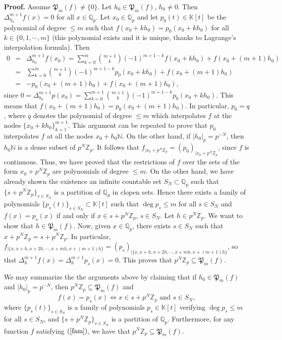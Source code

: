 \documentclass[12pt,a4paper]{amsart}
\theoremstyle{definition}
\begin{document}
\noindent \textbf{Proof. }  Assume  $\mathfrak{P}_m(f) \neq \{0\}$. Let  $h_0\in \mathfrak{P}_m(f)$, $h_0\neq 0$. Then
$\Delta_{h_0}^{m+1}f(x)=0$ for all $x\in\mathbb{Q}_p$. Let $x_0\in\mathbb{Q}_p$ and let $p_0(t)\in\mathbb{K}[t]$ be the polynomial of degree $\leq m$ such that $f(x_0+kh_0)=p_0(x_0+kh_0)$ for all $k\in\{0,1,\cdots,m\}$ (this polynomial exists and it is unique, thanks to Lagrange's interpolation formula). Then
\begin{eqnarray*}
0 &=&
\Delta_{h_0}^{m+1}f(x_0)=\sum_{k=0}^m\binom{m+1}{k}(-1)^{m+1-k}f(x_0+kh_0)+f(x_0+(m+1)h_0)\\
&=& \sum_{k=0}^m\binom{m+1}{k}(-1)^{m+1-k}p_0(x_0+kh_0)+f(x_0+(m+1)h_0)\\
&=& -p_0(x_0+(m+1)h_0)+f(x_0+(m+1)h_0),
\end{eqnarray*}
since  $0=\Delta_{h_0}^{m+1}p(x_0)=\sum_{k=0}^{m+1}\binom{m+1}{k}(-1)^{m+1-k}p_0(x_0+kh_0)$. This means that $f(x_0+(m+1)h_0)=p_0(x_0+(m+1)h_0)$. In particular, $p_0=q$, where $q$ denotes the polynomial of degree $\leq m$ which interpolates $f$ at the nodes $\{x_0+kh_0\}_{k=1}^{m+1}$. This argument can be repeated to prove that $p_0$ interpolates $f$ at all the nodes $x_0+h_0\mathbb{N}$. On the other hand, if $|h_0|_p=p^{-N}$, then $h_0\mathbb{N}$ is a dense subset of $p^N\mathbb{Z}_p$. It follows that $f_{|x_0+p^N\mathbb{Z}_p}=(p_0)_{|x_0+p^N\mathbb{Z}_p}$, since $f$ is continuous. Thus, we have proved that the restrictions of $f$ over the sets of the form $x_0+p^N\mathbb{Z}_p$ are polynomials of degree $\leq m$. On the other hand, we have already shown the  existence an infinite countable set $S_N\subset \mathbb{Q}_p$ such that $\{s+p^N\mathbb{Z}_p\}_{s\in S_N}$ is a partition of $\mathbb{Q}_p$ in clopen sets. Hence there exists a family of polynomials $\{p_s(t)\}_{s\in S_N}\subset \mathbb{K}[t]$ such that $\deg p_s\leq m$ for all $s\in S_N$ and $f(x)=p_s(x)$ if and only if $x\in s+p^N\mathbb{Z}_p$, $s\in S_N$. Let $h\in p^N\mathbb{Z}_p$. We want to show that $h\in \mathfrak{P}_m(f)$. Now, given $x\in \mathbb{Q}_p$, there exists $s\in S_N$ such that $x+p^N\mathbb{Z}_p=s+p^N\mathbb{Z}_p$. In particular, $f_{|\{x,x+h,x+2h,\cdots,x+mh,x+(m+1)h\}}=(p_s)_{|\{x,x+h,x+2h,\cdots,x+mh,x+(m+1)h\}}$, so that $\Delta_h^{m+1} f(x)= \Delta_h^{m+1} p_s(x)=0$. This proves that $p^N\mathbb{Z}_p\subseteq \mathfrak{P}_m(f)$.

We may summarize the the arguments above by claiming that if $h_0\in \mathfrak{P}_m(f)$ and $|h_0|_p=p^{-N}$, then $p^N\mathbb{Z}_p\subseteq \mathfrak{P}_m(f)$ and
\begin{equation}\label{fam}
f(x)=p_s(x) \Leftrightarrow x\in s+p^N\mathbb{Z}_p \text{ and } s\in S_N,
\end{equation}
where  $\{p_s(t)\}_{s\in S_N}$ is a family of polynomials $p_s\in \mathbb{K}[t]$ verifying  $\deg p_s\leq m$ for all $s\in S_N$, and  $\{s+p^N\mathbb{Z}_p\}_{s\in S_N}$ is a partition of $\mathbb{Q}_p$. Furthermore, for any function $f$ satisfying $(\ref{fam})$, we have that  $p^N\mathbb{Z}_p\subseteq \mathfrak{P}_m(f)$.
\end{document}
